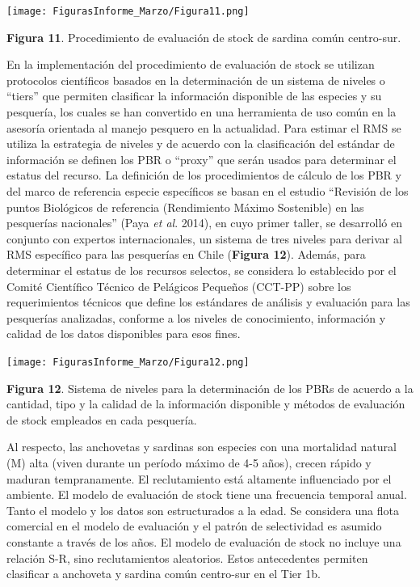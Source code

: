\documentclass[
  spanish,
]{article}
\begin{document}
\begin{center}
\texttt{[image: FigurasInforme\_Marzo/Figura11.png]}
\end{center}

\small

\textbf{Figura 11}. Procedimiento de evaluación de stock de sardina
común centro-sur. \vspace{0.5cm} \normalsize

En la implementación del procedimiento de evaluación de stock se
utilizan protocolos científicos basados en la determinación de un
sistema de niveles o ``tiers'' que permiten clasificar la información
disponible de las especies y su pesquería, los cuales se han convertido
en una herramienta de uso común en la asesoría orientada al manejo
pesquero en la actualidad. Para estimar el RMS se utiliza la estrategia
de niveles y de acuerdo con la clasificación del estándar de información
se definen los PBR o ``proxy'' que serán usados para determinar el
estatus del recurso. La definición de los procedimientos de cálculo de
los PBR y del marco de referencia especie específicos se basan en el
estudio ``Revisión de los puntos Biológicos de referencia (Rendimiento
Máximo Sostenible) en las pesquerías nacionales'' (Paya \emph{et al}.
2014), en cuyo primer taller, se desarrolló en conjunto con expertos
internacionales, un sistema de tres niveles para derivar al RMS
específico para las pesquerías en Chile (\textbf{Figura 12}). Además,
para determinar el estatus de los recursos selectos, se considera lo
establecido por el Comité Científico Técnico de Pelágicos Pequeños
(CCT-PP) sobre los requerimientos técnicos que define los estándares de
análisis y evaluación para las pesquerías analizadas, conforme a los
niveles de conocimiento, información y calidad de los datos disponibles
para esos fines.

\begin{center}
\texttt{[image: FigurasInforme\_Marzo/Figura12.png]}
\end{center}

\small

\textbf{Figura 12}. Sistema de niveles para la determinación de los PBRs
de acuerdo a la cantidad, tipo y la calidad de la información disponible
y métodos de evaluación de stock empleados en cada pesquería.
\vspace{0.5cm} \normalsize

Al respecto, las anchovetas y sardinas son especies con una mortalidad
natural (M) alta (viven durante un período máximo de 4-5 años), crecen
rápido y maduran tempranamente. El reclutamiento está altamente
influenciado por el ambiente. El modelo de evaluación de stock tiene una
frecuencia temporal anual. Tanto el modelo y los datos son estructurados
a la edad. Se considera una flota comercial en el modelo de evaluación y
el patrón de selectividad es asumido constante a través de los años. El
modelo de evaluación de stock no incluye una relación S-R, sino
reclutamientos aleatorios. Estos antecedentes permiten clasificar a
anchoveta y sardina común centro-sur en el Tier 1b.
\end{document}
